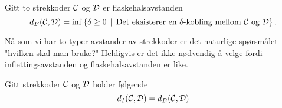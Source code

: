 \begin{definisjon}\label{def:FlaskAvst}
Gitt to strekkoder $\mathcal{C}$ og $\mathcal{D}$ er flaskehalsavstanden
\[d_B(\mathcal{C},\mathcal{D}) = \inf\left\{\delta\geq 0\,\mid\,\text{Det eksisterer en $\delta$-kobling mellom $\mathcal{C}$ og $\mathcal{D}$}\right\}.\]
\end{definisjon}

Nå som vi har to typer avstander av strekkoder er det
naturlige spørsmålet "hvilken skal man bruke?" Heldigvis
er det ikke nødvendig å velge fordi inflettingsavstanden
og flaskehalsavstanden er like.

\begin{teorem}\label{trm:FA_lik_IA}
Gitt strekkoder $\mathcal{C}$ og $\mathcal{D}$ holder følgende
\[d_I(\mathcal{C},\mathcal{D}) = d_B(\mathcal{C},\mathcal{D})\]
\end{teorem}
\bevis{

}
